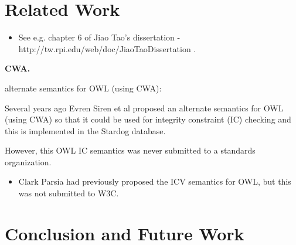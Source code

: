\documentclass{llncs}
\begin{document}
\section{Related Work}

\begin{itemize}
	\item See e.g. chapter 6 of Jiao Tao's dissertation - http://tw.rpi.edu/web/doc/JiaoTaoDissertation .
\end{itemize}

\textbf{CWA.}

alternate semantics for OWL (using CWA):

Several years ago Evren Siren et al proposed an alternate semantics for OWL (using CWA) so that it could be used for integrity constraint (IC) checking and this is implemented in the Stardog database. 

However, this OWL IC semantics was never submitted to a standards organization.

\begin{itemize}
	\item Clark Parsia had previously proposed the ICV semantics for OWL, but this was not submitted to W3C.
\end{itemize}

\section{Conclusion and Future Work}

{}

\setcounter{tocdepth}{1}
\end{document}
